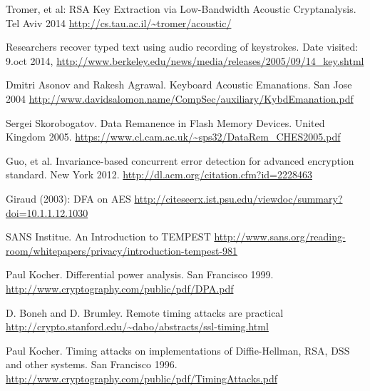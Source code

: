 \renewcommand*{\bibname}{References}



\begin{thebibliography}{12}


 Tromer, et al: RSA Key Extraction via Low-Bandwidth Acoustic Cryptanalysis. Tel Aviv 2014 
\url{http://cs.tau.ac.il/~tromer/acoustic/}



 Researchers recover typed text using audio recording of keystrokes. Date visited: 9.oct 2014, 
\url{http://www.berkeley.edu/news/media/releases/2005/09/14_key.shtml}

 Dmitri Asonov and Rakesh Agrawal. Keyboard Acoustic Emanations. San Jose 2004
\url{http://www.davidsalomon.name/CompSec/auxiliary/KybdEmanation.pdf}


 Sergei Skorobogatov. Data Remanence in Flash Memory Devices. United Kingdom 2005. 
\url{https://www.cl.cam.ac.uk/~sps32/DataRem_CHES2005.pdf}


 Guo, et al. Invariance-based concurrent error detection for advanced encryption standard. New York 2012.
\url{http://dl.acm.org/citation.cfm?id=2228463}

 Giraud (2003): DFA on AES
\url{http://citeseerx.ist.psu.edu/viewdoc/summary?doi=10.1.1.12.1030}


 SANS Institue. An Introduction to TEMPEST
\url{http://www.sans.org/reading-room/whitepapers/privacy/introduction-tempest-981}



 Paul Kocher. Differential power analysis. San Francisco 1999.
\url{http://www.cryptography.com/public/pdf/DPA.pdf}


 D. Boneh and D. Brumley. Remote timing attacks are practical
\url{http://crypto.stanford.edu/~dabo/abstracts/ssl-timing.html}

 Paul Kocher. Timing attacks on implementations of Diffie-Hellman, RSA, DSS and other systems. San Francisco 1996.
\url{http://www.cryptography.com/public/pdf/TimingAttacks.pdf}


\end{thebibliography}